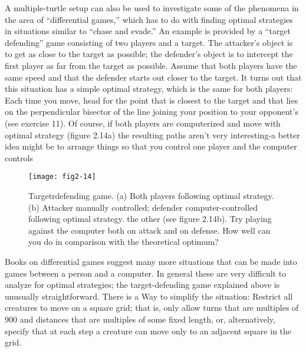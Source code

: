 \documentclass{book}
\begin{document}
A multiple-turtle setup can also be used to investigate some of the
phenomena in the area of ``differential games,'' which has to do with
finding optimal strategies in situations similar to ``chase and evade.'' An
example is provided by a ``target defending'' game consisting of two
players and a target. The attacker's object is to get as close to the
target as possible; the defender's object is to intercept the first player as
far from the target as possible. Assume that both players have the same
speed and that the defender starts out closer to the target. It turns out
that this situation has a simple optimal strategy, which is the same for
both players: Each time you move, head for the point that is closest to
the target and that lies on the perpendicular bisector of the line joining
your position to your opponent's (see exercise 11). Of course, if both
players are computerized and move with optimal strategy (figure 2.14a)
the resulting paths aren't very interesting-a better idea might be to
arrange things so that you control one player and the computer controls

\begin{figure}
\begin{center}
\texttt{[image: fig2-14]}
\caption{Targetrdefending game. (a) Both players following optimal strategy. (b) Attacker manually controlled; defender computer-controlled following optimal strategy. the other (see figure 2.14b). Try playing against the computer both on attack and on defense. How well can you do in comparison with the theoretical optimum?}
\end{center}
\end{figure}

Books on differential games suggest many more situations that can be
made into games between a person and a computer. In general these
are very difficult to analyze for optimal strategies; the target-defending
game explained above is unusually straightforward. There is a Way to
simplify the situation: Restrict all creatures to move on a square grid;
that is, only allow turns that are multiples of 900 and distances that
are multiples of some fixed length, or, alternatively, specify that at each
step a creature can move only to an adjacent square in the grid.
\end{document}
